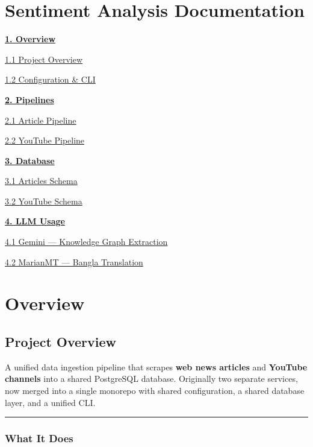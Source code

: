\documentclass[
]{article}
\author{}
\date{}
\newcommand{\indextopic}[2]{\noindent\hyperref[#1]{\textbf{#2}}\par}
\newcommand{\indexentry}[2]{\noindent\hspace*{1.5em}\hyperref[#1]{#2}\nobreak\hfill\hyperref[#1]{\pageref*{#1}}\par}
\begin{document}
\section*{Sentiment Analysis Documentation}
\indextopic{topic-overview}{1. Overview}
\vspace{0.25em}
\indexentry{file-project-overview}{1.1 Project Overview}
\indexentry{file-configuration-cli}{1.2 Configuration \& CLI}
\vspace{0.9em}

\indextopic{topic-pipelines}{2. Pipelines}
\vspace{0.25em}
\indexentry{file-article-pipeline}{2.1 Article Pipeline}
\indexentry{file-youtube-pipeline}{2.2 YouTube Pipeline}
\vspace{0.9em}

\indextopic{topic-database}{3. Database}
\vspace{0.25em}
\indexentry{file-articles-schema}{3.1 Articles Schema}
\indexentry{file-youtube-schema}{3.2 YouTube Schema}
\vspace{0.9em}

\indextopic{topic-llm-usage}{4. LLM Usage}
\vspace{0.25em}
\indexentry{file-gemini-kg}{4.1 Gemini --- Knowledge Graph Extraction}
\indexentry{file-marianmt-translation}{4.2 MarianMT --- Bangla Translation}
\newpage

\label{topic-overview}
\section{Overview}
\label{file-project-overview}
\subsection{Project Overview}\label{sentiment-analysis--project-overview}

A unified data ingestion pipeline that scrapes \textbf{web news
articles} and \textbf{YouTube channels} into a shared PostgreSQL
database. Originally two separate services, now merged into a single
monorepo with shared configuration, a shared database layer, and a
unified CLI.

\begin{center}\rule{0.5\linewidth}{0.5pt}\end{center}

\subsubsection{What It Does}\label{what-it-does}
\end{document}
